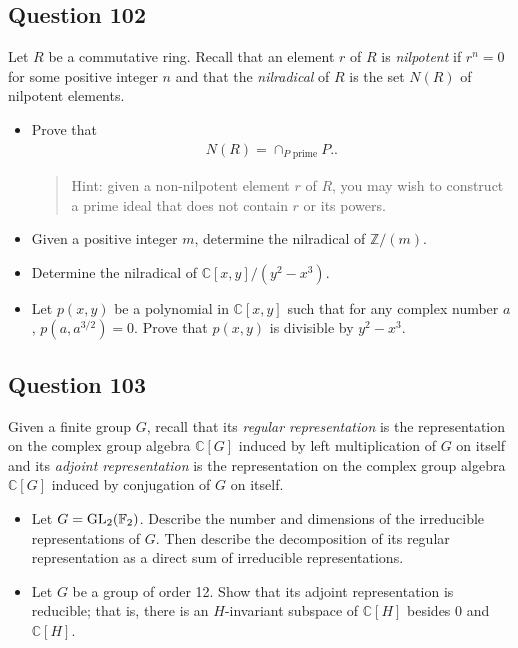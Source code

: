 \documentclass[12pt]{article}
\begin{document}
\hypertarget{question-102}{%
\subsection{Question 102}\label{question-102}}

Let \(R\) be a commutative ring. Recall that an element \(r\) of \(R\)
is \textit{nilpotent} if \(r^n=0\) for some positive integer \(n\) and
that the \textit{nilradical} of \(R\) is the set \(N(R)\) of nilpotent
elements.

\begin{itemize}
\item
  Prove that \begin{align*}
  N(R)=\cap_{P\text{ prime}}P.
  .\end{align*}

  \begin{quote}
  Hint: given a non-nilpotent element \(r\) of \(R\), you may wish to
  construct a prime ideal that does not contain \(r\) or its powers.
  \end{quote}
\item
  Given a positive integer \(m\), determine the nilradical of
  \(\mathbb Z/(m)\).
\item
  Determine the nilradical of \(\mathbb C[x,y]/(y^2-x^3)\).
\item
  Let \(p(x,y)\) be a polynomial in \(\mathbb C[x,y]\) such that for any
  complex number \(a\), \(p(a,a^{3/2})=0\). Prove that \(p(x,y)\) is
  divisible by \(y^2-x^3\).
\end{itemize}

\hypertarget{question-103}{%
\subsection{Question 103}\label{question-103}}

Given a finite group \(G\), recall that its \emph{regular
representation} is the representation on the complex group algebra
\(\mathbb C[G]\) induced by left multiplication of \(G\) on itself and
its \textit{adjoint representation} is the representation on the complex
group algebra \(\mathbb C[G]\) induced by conjugation of \(G\) on
itself.

\begin{itemize}
\item
  Let \(G={\text{GL}}_2(\mathbb F_2)\). Describe the number and dimensions of
  the irreducible representations of \(G\). Then describe the
  decomposition of its regular representation as a direct sum of
  irreducible representations.
\item
  Let \(G\) be a group of order 12. Show that its adjoint representation
  is reducible; that is, there is an \(H\)-invariant subspace of
  \(\mathbb C[H]\) besides 0 and \(\mathbb C[H]\).
\end{itemize}
\end{document}
